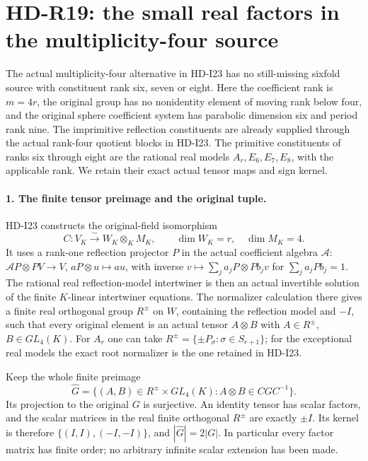 \section{HD-R19: the small real factors in the multiplicity-four source}
\label{sec:rank-four-small-real-tensor}

The actual multiplicity-four alternative in HD-I23 has no
still-missing sixfold source with constituent rank six, seven
or eight. Here the coefficient rank is \(m=4r\), the original
group has no nonidentity element of moving rank below four,
and the original sphere coefficient system has parabolic
dimension six and period rank nine. The imprimitive
reflection constituents are already supplied through the
actual rank-four quotient blocks in HD-I23. The primitive
constituents of ranks six through eight are the rational
real models \(A_r,E_6,E_7,E_8\), with the applicable rank.
We retain their exact actual tensor maps and sign kernel.

\paragraph{1. The finite tensor preimage and the original tuple.}
HD-I23 constructs the original-field isomorphism
\[
 C:V_K\xrightarrow{\sim}W_K\otimes_K M_K,
             \qquad \dim W_K=r,\quad\dim M_K=4.          \tag{R19.1}
\]
It uses a rank-one reflection projector \(P\) in the
actual coefficient algebra \(\mathcal A\):
\(\mathcal A P\otimes P V\to V\),
\(aP\otimes u\mapsto au\), with inverse
\(v\mapsto\sum_j a_jP\otimes Pb_jv\) for
\(\sum_j a_jPb_j=1\). The rational real reflection-model
intertwiner is then an actual invertible solution of the
finite \(K\)-linear intertwiner equations. The normalizer
calculation there gives a finite real orthogonal group
\(R^{\pm}\) on \(W\), containing the reflection model
and \(-I\), such that every original element is an
actual tensor \(A\otimes B\) with
\(A\in R^{\pm}\), \(B\in GL_4(K)\).
For \(A_r\) one can take \(R^{\pm}=\{\pm P_\sigma:
\sigma\in S_{r+1}\}\); for the exceptional real models
the exact root normalizer is the one retained in HD-I23.

Keep the whole finite preimage
\[
 \widehat G=\{(A,B)\in R^{\pm}\times GL_4(K):
                         A\otimes B\in CGC^{-1}\}.
                                                               \tag{R19.2}
\]
Its projection to the original \(G\) is surjective.
An identity tensor has scalar factors, and the scalar
matrices in the real finite orthogonal \(R^{\pm}\)
are exactly \(\pm I\). Its kernel is therefore
\(\{(I,I),(-I,-I)\}\), and
\(|\widehat G|=2|G|\). In particular every factor
matrix has finite order; no arbitrary infinite scalar
extension has been made.

